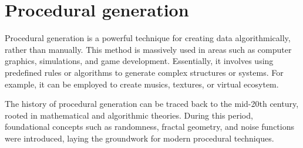 

\section{Procedural generation}
\label{sec:state-of-the-art_procedural-generation}

Procedural generation is a powerful technique for creating data algorithmically, rather than manually. This method is massively used in areas such as computer graphics, simulations, and game development. Essentially, it involves using predefined rules or algorithms to generate complex structures or systems. For example, it can be employed to create musics, textures, or virtual ecosytem.

The history of procedural generation can be traced back to the mid-20th century, rooted in mathematical and algorithmic theories. During this period, foundational concepts such as randomness, fractal geometry, and noise functions were introduced, laying the groundwork for modern procedural techniques.


